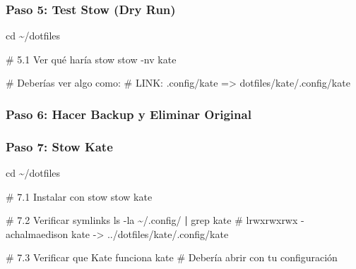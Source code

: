 \documentclass[
  doc,
  floatsintext,
  longtable,
  a4paper,
  nolmodern,
  notxfonts,
  notimes,
  12pt,
  colorlinks=true,linkcolor=blue,citecolor=blue,urlcolor=blue]{apa7}
\newenvironment{Shaded}{\begin{snugshade}}{\end{snugshade}}
\newcommand{\AttributeTok}[1]{\textcolor[rgb]{0.40,0.45,0.13}{#1}}
\newcommand{\BuiltInTok}[1]{\textcolor[rgb]{0.00,0.23,0.31}{#1}}
\newcommand{\CommentTok}[1]{\textcolor[rgb]{0.37,0.37,0.37}{#1}}
\newcommand{\ExtensionTok}[1]{\textcolor[rgb]{0.00,0.23,0.31}{#1}}
\newcommand{\FunctionTok}[1]{\textcolor[rgb]{0.28,0.35,0.67}{#1}}
\newcommand{\KeywordTok}[1]{\textcolor[rgb]{0.00,0.23,0.31}{\textbf{#1}}}
\newcommand{\NormalTok}[1]{\textcolor[rgb]{0.00,0.23,0.31}{#1}}
\newcommand{\VariableTok}[1]{\textcolor[rgb]{0.07,0.07,0.07}{#1}}
\begin{document}
\subsubsection{Paso 5: Test Stow (Dry
Run)}\label{paso-5-test-stow-dry-run}

\begin{Shaded}
\begin{Highlighting}[]
\BuiltInTok{cd}\NormalTok{ \textasciitilde{}/dotfiles}

\CommentTok{\# 5.1 Ver qué haría stow}
\ExtensionTok{stow} \AttributeTok{{-}nv}\NormalTok{ kate}

\CommentTok{\# Deberías ver algo como:}
\CommentTok{\# LINK: .config/kate =\textgreater{} dotfiles/kate/.config/kate}
\end{Highlighting}
\end{Shaded}

\subsubsection{Paso 6: Hacer Backup y Eliminar
Original}\label{paso-6-hacer-backup-y-eliminar-original}

\begin{Shaded}
\end{Shaded}

\subsubsection{Paso 7: Stow Kate}\label{paso-7-stow-kate}

\begin{Shaded}
\begin{Highlighting}[]
\BuiltInTok{cd}\NormalTok{ \textasciitilde{}/dotfiles}

\CommentTok{\# 7.1 Instalar con stow}
\ExtensionTok{stow}\NormalTok{ kate}

\CommentTok{\# 7.2 Verificar symlinks}
\FunctionTok{ls} \AttributeTok{{-}la}\NormalTok{ \textasciitilde{}/.config/ }\KeywordTok{|} \FunctionTok{grep}\NormalTok{ kate}
\CommentTok{\# lrwxrwxrwx  {-} achalmaedison kate {-}\textgreater{} ../dotfiles/kate/.config/kate}

\CommentTok{\# 7.3 Verificar que Kate funciona}
\ExtensionTok{kate}
\CommentTok{\# Debería abrir con tu configuración}
\end{Highlighting}
\end{Shaded}
\end{document}
